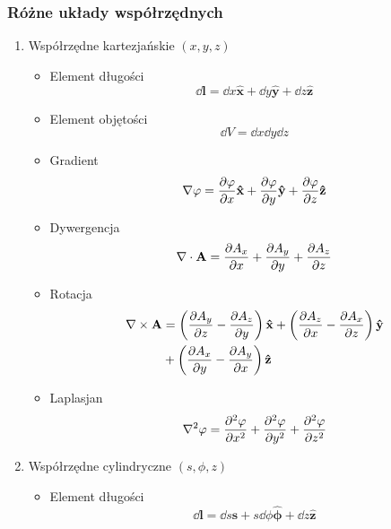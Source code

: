 \documentclass[../main.tex]{subfiles}
\begin{document}
\subsubsection*{Różne układy współrzędnych}
\begin{enumerate}
    \item Współrzędne kartezjańskie \((x,y,z)\)
    
    \begin{itemize}
    \item Element długości
    \begin{equation*}
        \dd{\mathbf{l}}=\dd{x}\mathbf{\hat{x}}+\dd{y}\mathbf{\hat{y}}+\dd{z}\mathbf{\hat{z}}
    \end{equation*}
    \item Element objętości
    \begin{equation*}
        \dd{V}=\dd{x}\dd{y}\dd{z}
    \end{equation*}
        \item Gradient
        \begin{equation*}
            \nabla \varphi=\pdv{\varphi}{x}\mathbf{\hat{x}}+\pdv{\varphi}{y}\mathbf{\hat{y}}+\pdv{\varphi}{z}\mathbf{\hat{z}}
        \end{equation*}
        \item Dywergencja
        \begin{equation*}
            \nabla\cdot\mathbf{A}=\pdv{A_x}{x}+\pdv{A_y}{y}+\pdv{A_z}{z}
        \end{equation*}
        \item Rotacja
        \begin{equation*}
        \begin{split}
            \nabla\times\mathbf{A}&=\left(\pdv{A_y}{z}-\pdv{A_z}{y}\right)\mathbf{\hat{x}}+\left(\pdv{A_z}{x}-\pdv{A_x}{z}\right)\mathbf{\hat{y}}\\
            &+\left(\pdv{A_x}{y}-\pdv{A_y}{x}\right)\mathbf{\hat{z}}
        \end{split}
        \end{equation*}
        \item Laplasjan
        \begin{equation*}
            \nabla^2\varphi=\pdv[2]{\varphi}{x}+\pdv[2]{\varphi}{y}+\pdv[2]{\varphi}{z}
        \end{equation*}
    \end{itemize}

    \item Współrzędne cylindryczne \((s,\phi,z)\)
    \begin{itemize}
    \item Element długości
    \begin{equation*}
        \dd{\mathbf{l}}=\dd{s}\mathbf{\hat{s}}+s\dd{\phi}\boldsymbol{\hat{\phi}}+\dd{z}\mathbf{\hat{z}}
    \end{equation*}
    

\end{itemize}
\end{enumerate}
\end{document}
